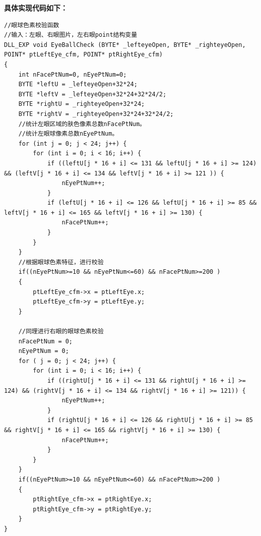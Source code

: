 \documentclass[12pt,hyperref,a4paper,UTF8]{ctexart}
\begin{document}
        \textbf{具体实现代码如下：}
        \begin{lstlisting}[caption={眼球色素和眼球位置校验}, label={lst:example}]
//眼球色素校验函数
//输入：左眼、右眼图片，左右眼point结构变量
DLL_EXP void EyeBallCheck (BYTE* _lefteyeOpen, BYTE* _righteyeOpen, POINT* ptLeftEye_cfm, POINT* ptRightEye_cfm)
{
    int nFacePtNum=0, nEyePtNum=0;
    BYTE *leftU = _lefteyeOpen+32*24;
    BYTE *leftV = _lefteyeOpen+32*24+32*24/2;
    BYTE *rightU = _righteyeOpen+32*24;
    BYTE *rightV = _righteyeOpen+32*24+32*24/2;
    //统计左眼区域的肤色像素总数nFacePtNum。
    //统计左眼球像素总数nEyePtNum。
    for (int j = 0; j < 24; j++) {
        for (int i = 0; i < 16; i++) {
            if ((leftU[j * 16 + i] <= 131 && leftU[j * 16 + i] >= 124) && (leftV[j * 16 + i] <= 134 && leftV[j * 16 + i] >= 121 )) {
                nEyePtNum++;
            }
            if (leftU[j * 16 + i] <= 126 && leftU[j * 16 + i] >= 85 && leftV[j * 16 + i] <= 165 && leftV[j * 16 + i] >= 130) {
                nFacePtNum++;
            }
        }
    }
    //根据眼球色素特征，进行校验
    if((nEyePtNum>=10 && nEyePtNum<=60) && nFacePtNum>=200 )
    {
        ptLeftEye_cfm->x = ptLeftEye.x;
        ptLeftEye_cfm->y = ptLeftEye.y;
    }

    //同理进行右眼的眼球色素校验
    nFacePtNum = 0;
    nEyePtNum = 0;
    for ( j = 0; j < 24; j++) {
        for (int i = 0; i < 16; i++) {
            if ((rightU[j * 16 + i] <= 131 && rightU[j * 16 + i] >= 124) && (rightV[j * 16 + i] <= 134 && rightV[j * 16 + i] >= 121)) {
                nEyePtNum++;
            }
            if (rightU[j * 16 + i] <= 126 && rightU[j * 16 + i] >= 85 && rightV[j * 16 + i] <= 165 && rightV[j * 16 + i] >= 130) {
                nFacePtNum++;
            }
        }
    }
    if((nEyePtNum>=10 && nEyePtNum<=60) && nFacePtNum>=200 )
    {
        ptRightEye_cfm->x = ptRightEye.x;
        ptRightEye_cfm->y = ptRightEye.y;
    }
}



\end{lstlisting}
\end{document}
